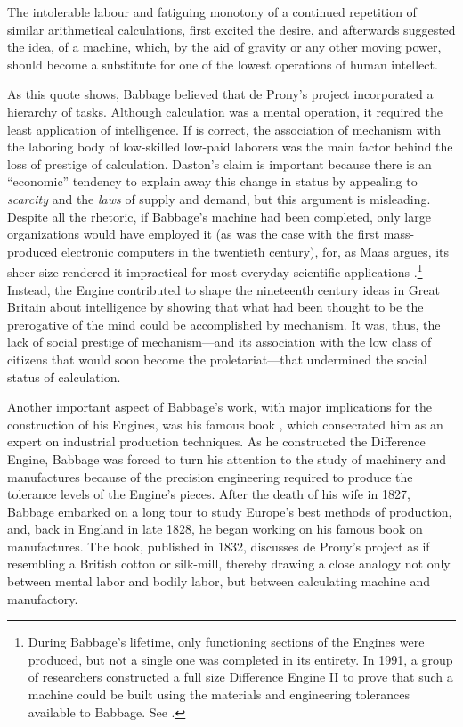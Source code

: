 \documentclass[version=last,draft=false,paper=A4,portrait,twoside=true,twocolumn=false,headinclude=false,footinclude=false,mpinclude=true,fontsize=12,BCOR=20mm,DIV=calc,pagesize=auto,open=right,chapterprefix=true,numbers=autoendperiod,headsepline=false,headings=twolinechapter,parskip=false]{scrbook}
\begin{document}
\begin{displayquote}
The intolerable labour and fatiguing monotony of a continued repetition of
similar arithmetical calculations, first excited the desire, and afterwards
suggested the idea, of a machine, which, by the aid of gravity or any other
moving power, should become a substitute for one of the lowest operations
of human intellect.
\end{displayquote}

As this quote shows, Babbage believed that de Prony's project incorporated
a hierarchy of tasks. Although calculation was a mental operation, it
required the least application of intelligence. If \textcite{daston1994} is
correct, the association of mechanism with the laboring body of low-skilled
low-paid laborers was the main factor behind the loss of prestige of
calculation. Daston's claim is important because there is an ``economic''
tendency to explain away this change in status by appealing to \emph{scarcity} and
the \emph{laws} of supply and demand, but this argument is misleading. Despite all
the rhetoric, if Babbage's machine had been completed, only large
organizations would have employed it (as was the case with the first
mass-produced electronic computers in the twentieth century), for, as Maas
argues, its sheer size rendered it impractical for most everyday scientific
applications \autocite[103]{maas2005}.\footnote{During Babbage's lifetime, only functioning sections of the Engines
were produced, but not a single one was completed in its entirety. In 1991,
a group of researchers constructed a full size Difference Engine II to
prove that such a machine could be built using the materials and
engineering tolerances available to Babbage. See \textcite{swade2000}.} Instead, the Engine
contributed to shape the nineteenth century ideas in Great Britain about
intelligence by showing that what had been thought to be the prerogative of
the mind could be accomplished by mechanism. It was, thus, the lack of
social prestige of mechanism---and its association with the low class of
citizens that would soon become the proletariat---that undermined the
social status of calculation.

Another important aspect of Babbage's work, with major implications for the
construction of his Engines, was his famous book
, which consecrated him as an expert on
industrial production techniques. As he constructed the Difference Engine,
Babbage was forced to turn his attention to the study of machinery and
manufactures because of the precision engineering required to produce the
tolerance levels of the Engine's pieces. After the death of his wife in
1827, Babbage embarked on a long tour to study Europe's best methods of
production, and, back in England in late 1828, he began working on his
famous book on manufactures. The book, published in 1832, discusses de
Prony's project as if resembling a British cotton or silk-mill, thereby
drawing a close analogy not only between mental labor and bodily labor, but
between calculating machine and manufactory.
\end{document}
